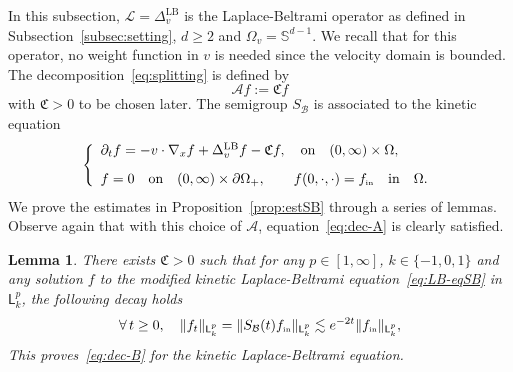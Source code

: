 \documentclass[11pt]{amsart}
\newtheorem{lemma}[theorem]{Lemma}
\theoremstyle{definition}
\theoremstyle{remark}
\numberwithin{equation}{section}
\def\BB{{\mathcal B}}
\newcommand{\init}{\text{{\tiny {\rm in}}}}
\newcommand{\sfL}{\mathsf{L}}
\begin{document}
In this subsection, $\mathcal{L} = \Delta_v ^{\text{LB}}$ is the Laplace-Beltrami operator as defined in Subsection~\ref{subsec:setting}, $d \ge 2$ and $\Omega_v=\mathbb S^{d-1}$. We recall that for this operator, no weight function in $v$ is needed since the velocity domain is bounded. The decomposition~\eqref{eq:splitting} is defined by
\begin{equation*}
  {\mathcal A} f  := \mathfrak{C}f
 \end{equation*}
with $\mathfrak{C}>0$ to be chosen later. The semigroup $S_\mathcal{B}$ is associated to the kinetic equation
 \begin{equation}
    \label{eq:LB-eqSB}
    \left\{
      \begin{array}{l}
      \partial_t f = - v \cdot \nabla_x f + \Delta_v^{\text{LB}} f - \mathfrak{C} f,  \quad \hbox{on}\quad (0,\infty) \times \Omega,   \\[3mm]
       f = 0 \quad \hbox{on}\quad (0,\infty) \times \partial\Omega_+, 
       \qquad f(0,\cdot,\cdot) = f_\init \quad \hbox{in}\quad \Omega.
      \end{array}
      \right.
    \end{equation}
We prove the estimates in Proposition~\ref{prop:estSB} through a series of lemmas. Observe again that with this choice of $\mathcal{A}$, equation~\eqref{eq:dec-A} is clearly satisfied.

\begin{lemma}\label{lem:estSBLpkLB}
  There exists $\mathfrak{C} > 0$ such that for any $p \in [1,\infty]$, $k \in \{ -1,0,1\}$ and any solution $f$ to the modified kinetic Laplace-Beltrami  equation~\eqref{eq:LB-eqSB} in $\sfL^p_k$, the following decay holds
  \begin{equation}
    \label{eq:dec-B-LB}
    \forall \, t \ge 0, \quad \| f_t \|_{\sfL^{p}_{k}} = \| S_\BB(t) f_\init \|_{\sfL^{p}_{k}} \lesssim   e^{- 2t} \| f_\init \|_{\sfL^{p}_{k}},
  \end{equation}
  This proves~\eqref{eq:dec-B} for the kinetic Laplace-Beltrami equation.
\end{lemma}
\end{document}
